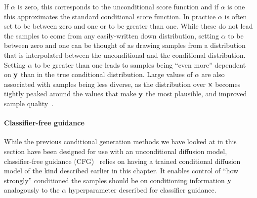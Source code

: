 If $\alpha$ is zero, this corresponds to the unconditional score function and if $\alpha$ is one this approximates the standard conditional score function. In practice $\alpha$ is often set to be between zero and one or to be greater than one. While these do not lead the samples to come from any easily-written down distribution, setting $\alpha$ to be between zero and one can be thought of as drawing samples from a distribution that is interpolated between the unconditional and the conditional distribution. Setting $\alpha$ to be greater than one leads to samples being ``even more'' dependent on ${\mathbf{y}}$ than in the true conditional distribution. Large values of $\alpha$ are also associated with samples being less diverse, as the distribution over ${\mathbf{x}}$ becomes tightly peaked around the values that make ${\mathbf{y}}$ the most plausible, and improved sample quality~\citep{ho2022classifier}.

\paragraph{Classifier-free guidance}
While the previous conditional generation methods we have looked at in this section have been designed for use with an unconditional diffusion model, classifier-free guidance (CFG)~\citep{ho2022classifier} relies on having a trained conditional diffusion model of the kind described earlier in this chapter. It enables control of ``how strongly'' conditioned the samples should be on conditioning information ${\mathbf{y}}$ analogously to the $\alpha$ hyperparameter described for classifier guidance.

